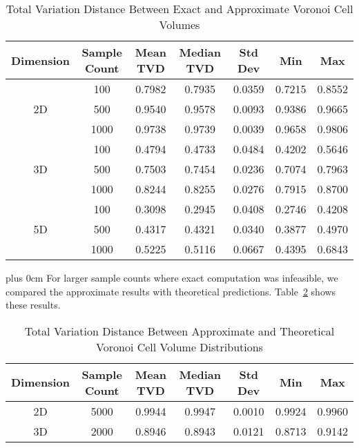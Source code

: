 \documentclass[conference]{IEEEtran}
\newcommand{\justifytext}{\leftskip=0pt \rightskip=0pt plus 0cm}
\begin{document}
\begin{table}[h]
\centering
\caption{Total Variation Distance Between Exact and Approximate Voronoi Cell Volumes}
\label{table:voronoi-exact-approx}
\begin{tabular}{|c|c|c|c|c|c|c|}
\hline
\textbf{Dimension} & \textbf{Sample Count} & \textbf{Mean TVD} & \textbf{Median TVD} & \textbf{Std Dev} & \textbf{Min} & \textbf{Max} \\
\hline
\multirow{3}{*}{2D} & 100 & 0.7982 & 0.7935 & 0.0359 & 0.7215 & 0.8552 \\
 & 500 & 0.9540 & 0.9578 & 0.0093 & 0.9386 & 0.9665 \\
 & 1000 & 0.9738 & 0.9739 & 0.0039 & 0.9658 & 0.9806 \\
\hline
\multirow{3}{*}{3D} & 100 & 0.4794 & 0.4733 & 0.0484 & 0.4202 & 0.5646 \\
 & 500 & 0.7503 & 0.7454 & 0.0236 & 0.7074 & 0.7963 \\
 & 1000 & 0.8244 & 0.8255 & 0.0276 & 0.7915 & 0.8700 \\
\hline
\multirow{3}{*}{5D} & 100 & 0.3098 & 0.2945 & 0.0408 & 0.2746 & 0.4208 \\
 & 500 & 0.4317 & 0.4321 & 0.0340 & 0.3877 & 0.4970 \\
 & 1000 & 0.5225 & 0.5116 & 0.0667 & 0.4395 & 0.6843 \\
\hline
\end{tabular}
\end{table}

\justifytext
For larger sample counts where exact computation was infeasible, we compared the approximate results with theoretical predictions. Table~\ref{table:voronoi-theoretical} shows these results.

\begin{table}[h]
\centering
\caption{Total Variation Distance Between Approximate and Theoretical Voronoi Cell Volume Distributions}
\label{table:voronoi-theoretical}
\begin{tabular}{|c|c|c|c|c|c|c|}
\hline
\textbf{Dimension} & \textbf{Sample Count} & \textbf{Mean TVD} & \textbf{Median TVD} & \textbf{Std Dev} & \textbf{Min} & \textbf{Max} \\
\hline
2D & 5000 & 0.9944 & 0.9947 & 0.0010 & 0.9924 & 0.9960 \\
3D & 2000 & 0.8946 & 0.8943 & 0.0121 & 0.8713 & 0.9142 \\
\hline
\end{tabular}
\end{table}
\end{document}
